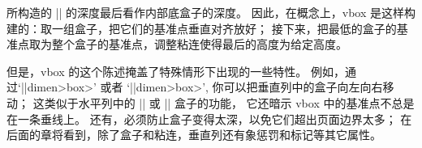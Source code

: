 \danger 所构造的 |\vbox| 的深度最后看作内部底盒子的深度。%
因此，在概念上，vbox 是这样构建的：取一组盒子，把它们的基准点垂直对齐放好；
接下来，把最低的盒子的基准点取为整个盒子的基准点，调整粘连使得最后的高度为给定高度。

\danger 但是，vbox 的这个陈述掩盖了特殊情形下出现的一些特性。%
例如，通过`|\moveright|\<dimen>\<box>' 或者 `|\moveleft|\<dimen>\<box>',
你可以把垂直列中的盒子向左向右移动；
这类似于水平列中的 |\raise| 或 |\lower| 盒子的功能，
它还暗示 vbox 中的基准点不总是在一条垂线上。%
还有，必须防止盒子变得太深，以免它们超出页面边界太多；
在后面的章将看到，除了盒子和粘连，垂直列还有象惩罚和标记等其它\hbox{属性。}

